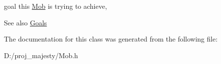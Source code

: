 goal this \hyperlink{class_mob}{Mob} is trying to achieve, 

\begin{DoxySeeAlso}{See also}
\hyperlink{class_mob_a886346a9f913203df0797f2c84dd8962}{Goals} 
\end{DoxySeeAlso}


The documentation for this class was generated from the following file\+:\begin{DoxyCompactItemize}
\item 
D\+:/proj\+\_\+majesty/Mob.\+h\end{DoxyCompactItemize}
